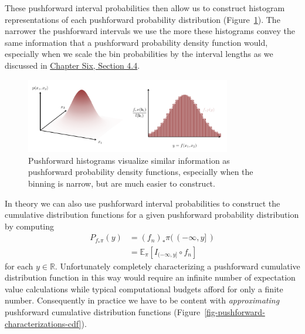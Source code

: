 \documentclass[
  letterpaper,
  DIV=11,
  numbers=noendperiod]{scrartcl}
\begin{document}
These pushforward interval probabilities then allow us to construct
histogram representations of each pushforward probability distribution
(Figure~\ref{fig-pushforward-characterizations-histogram}). The narrower
the pushforward intervals we use the more these histograms convey the
same information that a pushforward probability density function would,
especially when we scale the bin probabilities by the interval lengths
as we discussed in
\href{https://betanalpha.github.io/assets/chapters_html/density_functions.html\#lebesgue-probability-densities-as-limiting-interval-probabilities}{Chapter
Six, Section 4.4}.

\begin{figure}

{\centering \includegraphics[width=0.8\textwidth,height=\textheight]{figures/pushforward_characterizations/histogram/histogram.pdf}

}

\caption{\label{fig-pushforward-characterizations-histogram}Pushforward
histograms visualize similar information as pushforward probability
density functions, especially when the binning is narrow, but are much
easier to construct.}

\end{figure}

In theory we can also use pushforward interval probabilities to
construct the cumulative distribution functions for a given pushforward
probability distribution by computing \begin{align*}
P_{f_{*} \pi}(y)
&=
(f_{n})_{*} \pi( \, (-\infty, y] \, )
\\
&=
\mathbb{E}_{\pi} [ I_{(-\infty, y]} \circ f_{n} ]
\end{align*} for each \(y \in \mathbb{R}\). Unfortunately completely
characterizing a pushforward cumulative distribution function in this
way would require an infinite number of expectation value calculations
while typical computational budgets afford for only a finite number.
Consequently in practice we have to be content with \emph{approximating}
pushforward cumulative distribution functions
(Figure~\ref{fig-pushforward-characterizations-cdf}).
\end{document}

